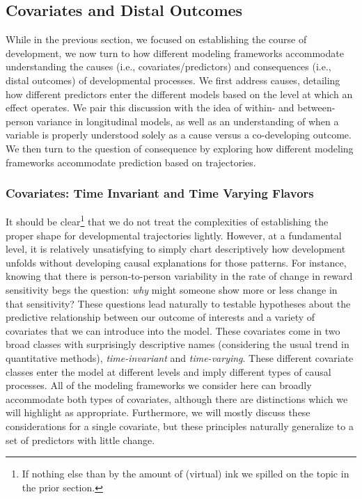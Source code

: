 \documentclass[11pt]{article}
\begin{document}
\subsection{Covariates and Distal Outcomes}
While in the previous section, we focused on establishing the course of development, we now turn to how different modeling frameworks accommodate understanding the causes (i.e., covariates/predictors) and consequences (i.e., distal outcomes) of developmental processes. We first address causes, detailing how different predictors enter the different models based on the level at which an effect operates. We pair this discussion with the idea of within- and between-person variance in longitudinal models, as well as an understanding of when a variable is properly understood solely as a cause versus a co-developing outcome. We then turn to the question of consequence by exploring how different modeling frameworks accommodate prediction based on trajectories.

\subsubsection{Covariates: Time Invariant and Time Varying Flavors}
It should be clear\footnote{If nothing else than by the amount of (virtual) ink we spilled on the topic in the prior section.} that we do not treat the complexities of establishing the proper shape for developmental trajectories lightly. However, at a fundamental level, it is relatively unsatisfying to simply chart descriptively how development unfolds without developing causal explanations for those patterns. For instance, knowing that there is person-to-person variability in the rate of change in reward sensitivity begs the question: \textit{why} might someone show more or less change in that sensitivity? These questions lead naturally to testable hypotheses about the predictive relationship between our outcome of interests and a variety of covariates that we can introduce into the model. These covariates come in two broad classes with surprisingly descriptive names (considering the usual trend in quantitative methods), \textit{time-invariant} and \textit{time-varying}. These different covariate classes enter the model at different levels and imply different types of causal processes. All of the modeling frameworks we consider here can broadly accommodate both types of covariates, although there are distinctions which we will highlight as appropriate. Furthermore, we will mostly discuss these considerations for a single covariate, but these principles naturally generalize to a set of predictors with little change.
\end{document}
